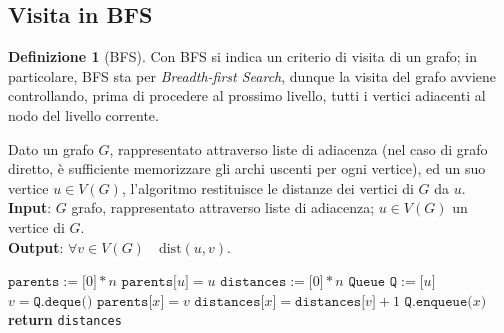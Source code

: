\documentclass[14pt]{extreport}
\theoremstyle{definition}
\newtheorem{definition}{Definizione}[subsection]
\theoremstyle{definition}
\begin{document}
\subsection{Visita in BFS}

\begin{definition}[BFS]
    Con BFS si indica un criterio di visita di un grafo; in particolare, BFS sta per \textit{Breadth-first Search}, dunque la visita del grafo avviene controllando, prima di procedere al prossimo livello, tutti i vertici adiacenti al nodo del livello corrente.
\end{definition}

\begin{algorithm}[H]
    \caption{
        Dato un grafo $G$, rappresentato attraverso liste di adiacenza (nel caso di grafo diretto, è sufficiente memorizzare gli archi uscenti per ogni vertice), ed un suo vertice $u \in V(G)$, l'algoritmo restituisce le distanze dei vertici di $G$ da $u$.\\
        \textbf{Input}: $G$ grafo, rappresentato attraverso liste di adiacenza; $u \in V(G)$ un vertice di $G$.\\
        \textbf{Output}: $\forall v \in V(G) \quad \mathrm{dist}(u, v)$.
    }

    \begin{algorithmic}[1]
        \label{bfs}

            \State $\texttt{parents}:=\texttt{[}0\texttt{]} * n$
            \State $\texttt{parents[}u\texttt{]} = u$
            \State $\texttt{distances}:=\texttt{[}0\texttt{]} * n$
            \State $\texttt{Queue Q} := \texttt{[}u\texttt{]}$
                \State $v = \texttt{Q.deque()}$
                    \State $\texttt{parents[}x\texttt{]} = v$
                    \State $\texttt{distances[}x\texttt{]}=\texttt{distances[}v\texttt{]} + 1$
                    \State $\texttt{Q.enqueue(}x\texttt{)}$
                \EndIf
                \EndFor
            \EndWhile
            \State \textbf{return} \texttt{distances}
        \EndFunction
    \end{algorithmic}
\end{algorithm}
\end{document}
